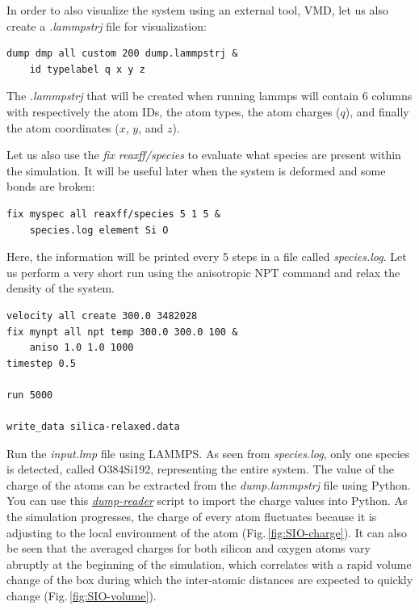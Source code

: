 \documentclass[9pt,tutorial]{livecoms}
\begin{document}
In order to also visualize the system using an external tool, VMD, let us also
create a \textit{.lammpstrj} file for visualization:
{\normalsize \begin{verbatim}
dump dmp all custom 200 dump.lammpstrj &
    id typelabel q x y z
\end{verbatim}}
The \textit{.lammpstrj} that will be created when running lammps will contain
6 columns with respectively the atom IDs, the atom types, the atom charges ($q$),
and finally the atom coordinates ($x$, $y$, and $z$).

Let us also use the \textit{fix reaxff/species} to evaluate what species are
present within the simulation. It will be useful later when the system is deformed
and some bonds are broken:
{\normalsize \begin{verbatim}
fix myspec all reaxff/species 5 1 5 &
    species.log element Si O
\end{verbatim}}
Here, the information will be printed every 5 steps in a file called \textit{species.log}.
Let us perform a very short run using the anisotropic NPT command and relax the
density of the system.
{\normalsize \begin{verbatim}
velocity all create 300.0 3482028
fix mynpt all npt temp 300.0 300.0 100 &
    aniso 1.0 1.0 1000
timestep 0.5

run 5000

write_data silica-relaxed.data
\end{verbatim}}
Run the \textit{input.lmp} file using LAMMPS. As seen from \textit{species.log},
only one species is detected, called O384Si192, representing the entire system.
The value of the charge of the atoms can be extracted from the \textit{dump.lammpstrj}
file using Python. You can use this
\href{https://raw.githubusercontent.com/lammpstutorials/lammpstutorials-article/main/files/tutorial5/dump-reader.py}{\textit{dump-reader}}
script to import the charge values into Python.
As the simulation progresses, the charge of every atom fluctuates
because it is adjusting to the local environment of the atom (Fig.\,\ref{fig:SIO-charge}).
It can also be seen that the averaged charges for both silicon and oxygen
atoms vary abruptly at the beginning of the simulation, which correlates with
a rapid volume change of the box during which the inter-atomic distances are
expected to quickly change (Fig.\,\ref{fig:SIO-volume}).
\end{document}
